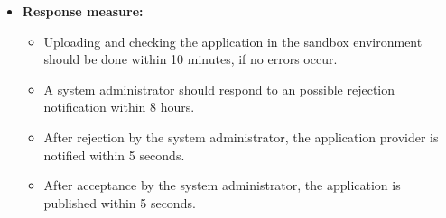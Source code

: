 \documentclass[english]{sareport}
\begin{document}
\begin{itemize}
    \item \textbf{Response measure:}
        \begin{itemize}
            \item Uploading and checking the application in the sandbox environment should be done within 10 minutes, if no errors occur.
            \item A system administrator should respond to an possible rejection notification within 8 hours.
            \item After rejection by the system administrator, the application provider is notified within 5 seconds.
            \item After acceptance by the system administrator, the application is published within 5 seconds.
        \end{itemize}
\end{itemize}
\end{document}
